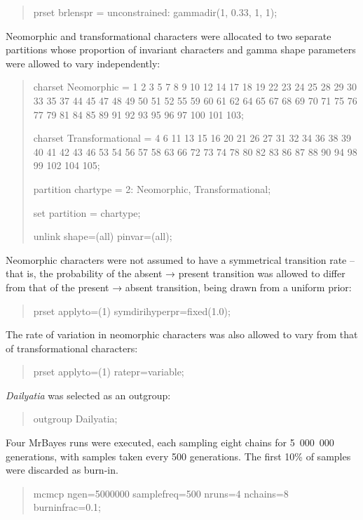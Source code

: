 \documentclass[]{book}
\theoremstyle{definition}
\theoremstyle{definition}
\theoremstyle{definition}
\theoremstyle{remark}
\begin{document}
\begin{quote}
prset brlenspr = unconstrained: gammadir(1, 0.33, 1, 1);
\end{quote}

Neomorphic and transformational characters
\citep[\emph{sensu}][]{Sereno2007} were allocated to two separate
partitions whose proportion of invariant characters and gamma shape
parameters were allowed to vary independently:

\begin{quote}
charset Neomorphic = 1 2 3 5 7 8 9 10 12 14 17 18 19 22 23 24 25 28 29
30 33 35 37 44 45 47 48 49 50 51 52 55 59 60 61 62 64 65 67 68 69 70 71
75 76 77 79 81 84 85 89 91 92 93 95 96 97 100 101 103;

charset Transformational = 4 6 11 13 15 16 20 21 26 27 31 32 34 36 38 39
40 41 42 43 46 53 54 56 57 58 63 66 72 73 74 78 80 82 83 86 87 88 90 94
98 99 102 104 105;

partition chartype = 2: Neomorphic, Transformational;

set partition = chartype;

unlink shape=(all) pinvar=(all);
\end{quote}

Neomorphic characters were not assumed to have a symmetrical transition
rate -- that is, the probability of the absent → present transition was
allowed to differ from that of the present → absent transition, being
drawn from a uniform prior:

\begin{quote}
prset applyto=(1) symdirihyperpr=fixed(1.0);
\end{quote}

The rate of variation in neomorphic characters was also allowed to vary
from that of transformational characters:

\begin{quote}
prset applyto=(1) ratepr=variable;
\end{quote}

\emph{Dailyatia} was selected as an outgroup:

\begin{quote}
outgroup Dailyatia;
\end{quote}

Four MrBayes runs were executed, each sampling eight chains for
5~000~000 generations, with samples taken every 500 generations. The
first 10\% of samples were discarded as burn-in.

\begin{quote}
mcmcp ngen=5000000 samplefreq=500 nruns=4 nchains=8 burninfrac=0.1;
\end{quote}
\end{document}
